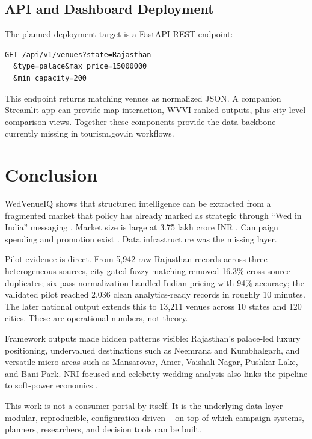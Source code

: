 \documentclass[conference]{IEEEtran}
\begin{document}
\subsection{API and Dashboard Deployment}

The planned deployment target is a FastAPI REST endpoint:

\begin{verbatim}
GET /api/v1/venues?state=Rajasthan
  &type=palace&max_price=15000000
  &min_capacity=200
\end{verbatim}

This endpoint returns matching venues as normalized JSON. A companion Streamlit app can provide map interaction, WVVI-ranked outputs, plus city-level comparison views. Together these components provide the data backbone currently missing in tourism.gov.in workflows.

\section{Conclusion}

WedVenueIQ shows that structured intelligence can be extracted from a fragmented market that policy has already marked as strategic through ``Wed in India'' messaging \cite{b9}. Market size is large at 3.75 lakh crore INR \cite{b1}. Campaign spending and promotion exist \cite{b10} \cite{b11}. Data infrastructure was the missing layer.

Pilot evidence is direct. From 5,942 raw Rajasthan records across three heterogeneous sources, city-gated fuzzy matching removed 16.3\% cross-source duplicates; six-pass normalization handled Indian pricing with 94\% accuracy; the validated pilot reached 2,036 clean analytics-ready records in roughly 10 minutes. The later national output extends this to 13,211 venues across 10 states and 120 cities. These are operational numbers, not theory.

Framework outputs made hidden patterns visible: Rajasthan's palace-led luxury positioning, undervalued destinations such as Neemrana and Kumbhalgarh, and versatile micro-areas such as Mansarovar, Amer, Vaishali Nagar, Pushkar Lake, and Bani Park. NRI-focused and celebrity-wedding analysis also links the pipeline to soft-power economics \cite{b8}.

This work is not a consumer portal by itself. It is the underlying data layer -- modular, reproducible, configuration-driven -- on top of which campaign systems, planners, researchers, and decision tools can be built.
\end{document}
